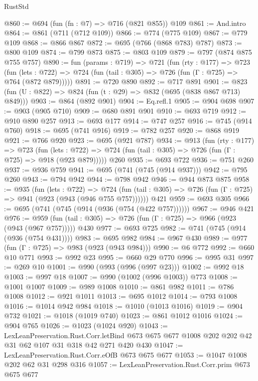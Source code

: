 \begin{lexlean}{RustStd}
\begin{coremodule}
@860 := @694 (fun (fn : @7) => @716 (@821 @855)) @109
@861 := And.intro
@864 := @861 (@711 (@712 @109))
@866 := @774 (@775 @109)
@867 := @779 @109
@868 := @866 @867
@872 := @695 (@766 (@868 @783) @787)
@873 := @800 @109
@874 := @799 @873
@875 := @803 @109
@879 := @797 (@874 @875 @755 @757)
@890 := fun (params : @719) =>
  @721
    (fun (rty : @177) =>
    @723
      (fun (lets : @722) => @724 (fun (tail : @305) => @726 (fun (Γ : @725) => @764 (@872 @879)))))
@891 := @720 @890
@892 := @717 @891
@901 := @823 (fun (U : @822) => @824 (fun (t : @29) => @832 (@695 (@838 @867 @713) @849)))
@903 := @864 (@892 @901)
@904 := Eq.refl.{1}
@905 := @904 @698
@907 := @903 (@905 @710)
@909 := @680 @891 @901
@910 := @693 @719
@912 := @910 @890 @257
@913 := @693 @177
@914 := @747 @257
@916 := @745 (@914 @760)
@918 := @695 (@741 @916)
@919 := @782 @257
@920 := @868 @919
@921 := @766 @920
@923 := @695 (@921 @787)
@934 := @913
    (fun (rty : @177) =>
    @723
      (fun (lets : @722) => @724 (fun (tail : @305) => @726 (fun (Γ : @725) => @918 (@923 @879)))))
    @260
@935 := @693 @722
@936 := @751 @260
@937 := @936 @759
@941 := @695 (@741 (@745 (@914 @937)))
@942 := @795 @260
@943 := @794 @942
@944 := @798 @942
@946 := @944 @873 @875
@958 := @935
    (fun (lets : @722) =>
    @724 (fun (tail : @305) => @726 (fun (Γ : @725) => @941 (@923 (@943 (@946 @755 @757))))))
    @421
@959 := @693 @305
@966 := @695 (@741 (@745 (@914 (@936 (@754 (@422 @757))))))
@967 := @946 @421
@976 := @959 (fun (tail : @305) => @726 (fun (Γ : @725) => @966 (@923 (@943 (@967 @757))))) @430
@977 := @693 @725
@982 := @741 (@745 (@914 (@936 (@754 @431))))
@983 := @695 @982
@984 := @967 @430
@989 := @977 (fun (Γ : @725) => @983 (@923 (@943 @984)))
@990 := @6 @772
@992 := @660 @10 @771
@993 := @992 @23
@995 := @660 @29 @770
@996 := @995 @31
@997 := @269 @10
@1001 := @990 (@993 (@996 (@997 @23)))
@1002 := @992 @18
@1003 := @997 @18
@1007 := @990 (@1002 (@996 @1003)) @773
@1008 := @1001 @1007
@1009 := @989 @1008
@1010 := @861 @982
@1011 := @786 @1008
@1012 := @921 @1011
@1013 := @695 @1012
@1014 := @793 @1008
@1016 := @1014 @942 @984
@1018 := @1010 (@1013 @1016)
@1019 := @904 @732
@1021 := @1018 (@1019 @740)
@1023 := @861 @1012 @1016
@1024 := @904 @765
@1026 := @1023 (@1024 @920)
@1043 := LexLeanPreservation.Rust.Corr.letBind
    @673
    @675
    @677
    @1008
    @202
    @202
    @42
    @31
    @62
    @107
    @31
    @318
    @42
    @271
    @420
    @430
@1047 := LexLeanPreservation.Rust.Corr.eOfB @673 @675 @677
@1053 := @1047 @1008 @202 @62 @31 @298 @316
@1057 := LexLeanPreservation.Rust.Corr.prim @673 @675 @677

\end{coremodule}
\end{lexlean}
